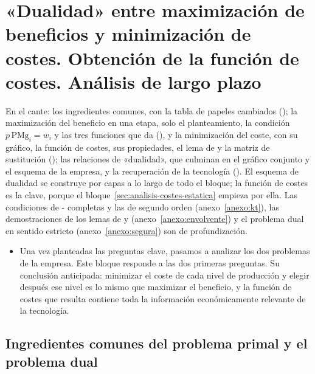 \documentclass[11pt]{article}
\begin{document}
\section{«Dualidad» entre maximización de beneficios\cortetitulo{} y minimización de costes. Obtención de la función de costes.\cortetitulo{} Análisis de largo plazo}\label{sec:dualidad-maximizacion-beneficios}

\begin{notaopositor}
En el cante: los ingredientes comunes, con la tabla de papeles cambiados (); la maximización del beneficio en una etapa, solo el planteamiento, la condición $p\,\mathrm{PMg}_i=w_i$ y las tres funciones que da (), y la minimización del coste, con su gráfico, la función de costes, sus propiedades, el lema de  y la matriz de sustitución (); las relaciones de «dualidad», que culminan en el gráfico conjunto y el esquema de la empresa, y la recuperación de la tecnología (). El esquema de dualidad se construye por capas a lo largo de todo el bloque; la función de costes es la clave, porque el bloque~\ref{sec:analisis-costes-estatica} empieza por ella. Las condiciones de - completas y las de segundo orden (anexo~\ref{anexo:kt}), las demostraciones de los lemas de  y  (anexo~\ref{anexo:envolvente}) y el problema dual en sentido estricto (anexo~\ref{anexo:segura}) son de profundización.
\end{notaopositor}

\begin{itemize}
\item Una vez planteadas las preguntas clave, pasamos a analizar los dos problemas de la empresa. Este bloque responde a las dos primeras preguntas. Su conclusión anticipada: minimizar el coste de cada nivel de producción y elegir después ese nivel es lo mismo que maximizar el beneficio, y la función de costes que resulta contiene toda la información económicamente relevante de la tecnología.
\end{itemize}

\subsection{Ingredientes comunes del problema primal y el problema dual}\label{sec:ingredientes-comunes-problema}
\end{document}
